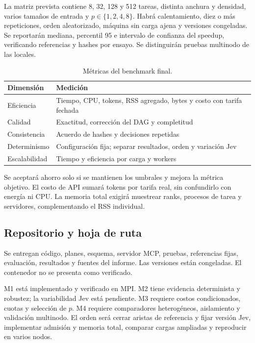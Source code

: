 La matriz prevista contiene 8, 32, 128 y 512 tareas, distinta anchura
y densidad, varios tamaños de entrada y $p\in\{1,2,4,8\}$.
Habrá calentamiento, diez o más repeticiones, orden aleatorizado,
máquina sin carga ajena y versiones congeladas. Se reportarán mediana,
percentil 95 e intervalo de confianza del speedup, verificando referencias
y hashes por ensayo. Se distinguirán pruebas multinodo de las locales.

\begin{table}[!t]
\caption{Métricas del benchmark final.}
\centering\small
\begin{tabular}{p{}p{}}
\toprule
Dimensión & Medición\\
\midrule
Eficiencia & Tiempo, CPU, tokens, RSS agregado, bytes y costo con tarifa fechada\\
Calidad & Exactitud, corrección del DAG y completitud\\
Consistencia & Acuerdo de hashes y decisiones repetidas\\
Determinismo & Configuración fija; separar resultados, orden y variación Jev\\
Escalabilidad & Tiempo y eficiencia por carga y workers\\
\bottomrule
\end{tabular}
\end{table}

Se aceptará ahorro solo si se mantienen los umbrales y mejora la
métrica objetivo. El costo de API sumará tokens por tarifa real,
sin confundirlo con energía ni CPU. La memoria total exigirá muestrear
ranks, procesos de tarea y servidores, complementando el RSS individual.

\subsection{Repositorio y hoja de ruta}
Se entregan código, planes, esquema, servidor MCP, pruebas, referencias
fijas, evaluación, resultados y fuentes del informe. Las versiones están
congeladas. El contenedor no se presenta como verificado.

M1 está implementado y verificado en MPI. M2 tiene evidencia determinista
y robustez; la variabilidad Jev está pendiente. M3 requiere costos
condicionados, cuotas y selección de $p$. M4 requiere comparadores
heterogéneos, aislamiento y validación multinodo. El orden será cerrar
aristas de referencia y fijar versión Jev, implementar admisión y
memoria total, comparar cargas ampliadas y reproducir en varios nodos.
